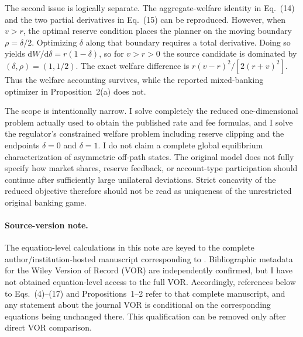 The second issue is logically separate. The aggregate-welfare identity in Eq.~(14) and the two partial derivatives in Eq.~(15) can be reproduced. However, when $v>r$, the optimal reserve condition places the planner on the moving boundary $\rho=\delta/2$. Optimizing $\delta$ along that boundary requires a total derivative. Doing so yields $\mathrm dW/\mathrm d\delta=r(1-\delta)$, so for $v>r>0$ the source candidate is dominated by $(\delta,\rho)=(1,1/2)$. The exact welfare difference is $r(v-r)^2/[2(r+v)^2]$. Thus the welfare accounting survives, while the reported mixed-banking optimizer in Proposition~2(a) does not.

The scope is intentionally narrow. I solve completely the reduced one-dimensional problem actually used to obtain the published rate and fee formulas, and I solve the regulator's constrained welfare problem including reserve clipping and the endpoints $\delta=0$ and $\delta=1$. I do not claim a complete global equilibrium characterization of asymmetric off-path states. The original model does not fully specify how market shares, reserve feedback, or account-type participation should continue after sufficiently large unilateral deviations. Strict concavity of the reduced objective therefore should not be read as uniqueness of the unrestricted original banking game.

\paragraph{Source-version note.}
The equation-level calculations in this note are keyed to the complete author/institution-hosted manuscript corresponding to \citet{ShyStenbacka2007}. Bibliographic metadata for the Wiley Version of Record (VOR) are independently confirmed, but I have not obtained equation-level access to the full VOR. Accordingly, references below to Eqs.~(4)--(17) and Propositions~1--2 refer to that complete manuscript, and any statement about the journal VOR is conditional on the corresponding equations being unchanged there. This qualification can be removed only after direct VOR comparison.
